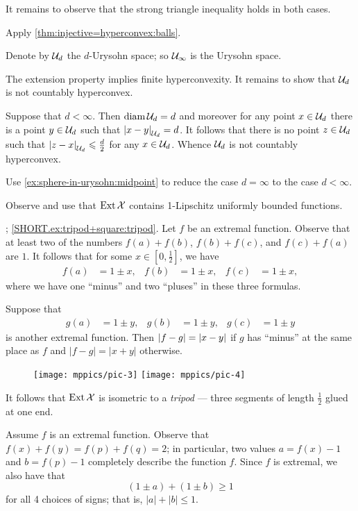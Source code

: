 It remains to observe that the strong triangle inequality holds in both cases.

Apply \ref{thm:injective=hyperconvex:balls}.

Denote by $\mathcal{U}_d$ the $d$-Urysohn space;
so $\mathcal{U}_\infty$ is the Urysohn space.

The extension property implies finite hyperconvexity.
It remains to show that $\mathcal{U}_d$ is not countably hyperconvex.

Suppose that $d<\infty$.
Then $\operatorname{\rm diam}\nolimits\mathcal{U}_d=d$ and moreover for any point $x\in\mathcal{U}_d$ there is a point $y\in\mathcal{U}_d$ such that $\dist{x}{y}{\spc{U}_d}=d$.
It follows that there is no point $z\in\mathcal{U}_d$ such that $\dist{z}{x}{\spc{U}_d}\le \tfrac d2$ for any $x\in\mathcal{U}_d$.
Whence $\mathcal{U}_d$ is not countably hyperconvex.

Use \ref{ex:sphere-in-urysohn:midpoint} to reduce the case $d=\infty$ to the case $d<\infty$.

Observe and use that $\mathop{\rm Ext}\nolimits\mathcal{X}$ contains 1-Lipschitz uniformly bounded functions.

\parbf{\ref{ex:tripod+square}}; \ref{SHORT.ex:tripod+square:tripod}.
Let $f$ be an extremal function.
Observe that at least two of the numbers $f(a)+f(b)$, $f(b)+f(c)$, and $f(c)+f(a)$ are $1$.
It follows that for some $x\in[0,\tfrac12]$, we have 
\begin{align*}
f(a)&=1\pm x,&
f(b)&=1\pm x,&
f(c)&=1\pm x,
\end{align*}
where we have one ``minus'' and two ``pluses'' in these three formulas.

Suppose that
\begin{align*}
g(a)&=1\pm y,& g(b)&=1\pm y,& g(c)&=1\pm y
\end{align*}
is another extremal function.
Then $|f-g|\z=|x-y|$ if $g$ has ``minus'' at the same place as $f$ and $|f-g|=|x+y|$ otherwise.

\begin{wrapfigure}{o}{30 mm}
\vskip-0mm
\centering
\texttt{[image: mppics/pic-3]}
\bigskip
\texttt{[image: mppics/pic-4]}
\end{wrapfigure}

It follows that $\mathop{\rm Ext}\nolimits\mathcal{X}$ is isometric to a {}\emph{tripod} --- three segments of length $\tfrac12$ glued at one end.

Assume $f$ is an extremal function.
Observe that 
$f(x)+f(y)=f(p)+f(q)=2$;
in particular, two values $a=f(x)-1$ and $b=f(p)-1$ completely describe the function $f$.
Since $f$ is extremal, we also have that 
\[(1\pm a)+(1\pm b)\ge 1\]
for all 4 choices of signs;
that is, $|a|+|b|\le 1$.

